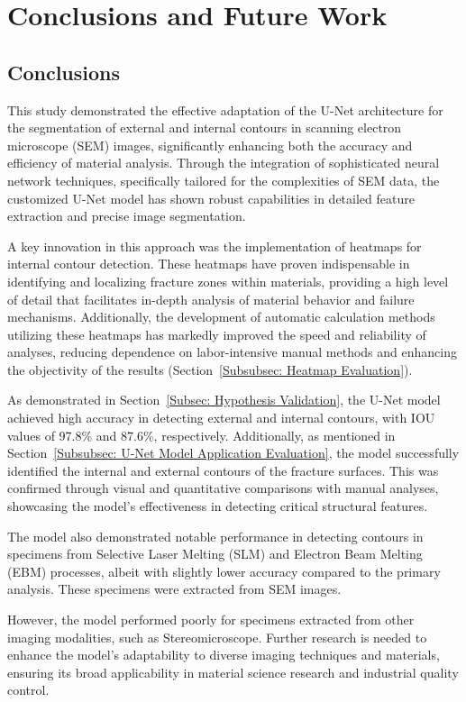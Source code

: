\documentclass[preprint,12pt]{elsarticle}
\begin{document}
\section{Conclusions and Future Work}
\label{Sec: Conclusions and future work}

\subsection{Conclusions}
This study demonstrated the effective adaptation of the U-Net architecture for the segmentation of external and internal contours in scanning electron microscope (SEM) images, significantly enhancing both the accuracy and efficiency of material analysis. Through the integration of sophisticated neural network techniques, specifically tailored for the complexities of SEM data, the customized U-Net model has shown robust capabilities in detailed feature extraction and precise image segmentation.

A key innovation in this approach was the implementation of heatmaps for internal contour detection. These heatmaps have proven indispensable in identifying and localizing fracture zones within materials, providing a high level of detail that facilitates in-depth analysis of material behavior and failure mechanisms. Additionally, the development of automatic calculation methods utilizing these heatmaps has markedly improved the speed and reliability of analyses, reducing dependence on labor-intensive manual methods and enhancing the objectivity of the results (Section~\ref{Subsubsec: Heatmap Evaluation}).

As demonstrated in Section~\ref{Subsec: Hypothesis Validation}, the U-Net model achieved high accuracy in detecting external and internal contours, with IOU values of 97.8\% and 87.6\%, respectively. Additionally, as mentioned in Section~\ref{Subsubsec: U-Net Model Application Evaluation}, the model successfully identified the internal and external contours of the fracture surfaces. This was confirmed through visual and quantitative comparisons with manual analyses, showcasing the model's effectiveness in detecting critical structural features.

The model also demonstrated notable performance in detecting contours in specimens from Selective Laser Melting (SLM) and Electron Beam Melting (EBM) processes, albeit with slightly lower accuracy compared to the primary analysis. These specimens were extracted from SEM images.

However, the model performed poorly for specimens extracted from other imaging modalities, such as Stereomicroscope.
Further research is needed to enhance the model's adaptability to diverse imaging techniques and materials, ensuring its broad applicability in material science research and industrial quality control.
\end{document}
